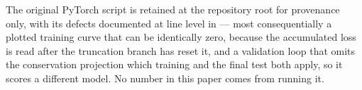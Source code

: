 The original PyTorch script is retained at the repository root for provenance only, with
its defects documented at line level in  --- most
consequentially a plotted training curve that can be identically zero, because the
accumulated loss is read after the truncation branch has reset it, and a validation loop
that omits the conservation projection which training and the final test both apply, so it
scores a different model. No number in this paper comes from running it.
